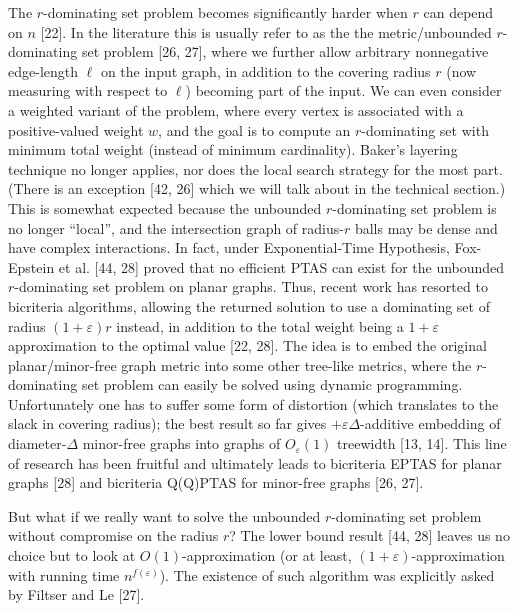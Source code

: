 The $r$-dominating set problem becomes significantly harder when $r$ can depend on $n$ [22]. In the literature this is usually refer to as the the metric/unbounded $r$-dominating set problem [26, 27], where we further allow arbitrary nonnegative edge-length $\ell$ on the input graph, in addition to the covering radius $r$ (now measuring with respect to $\ell$) becoming part of the input. We can even consider a weighted variant of the problem, where every vertex is associated with a positive-valued weight $w$, and the goal is to compute an $r$-dominating set with minimum total weight (instead of minimum cardinality). Baker’s layering technique no longer applies, nor does the local search strategy for the most part. (There is an exception [42, 26] which we will talk about in the technical section.) This is somewhat expected because the unbounded $r$-dominating set problem is no longer “local”, and the intersection graph of radius-$r$ balls may be dense and have complex interactions. In fact, under Exponential-Time Hypothesis, Fox-Epstein et al. [44, 28] proved that no efficient PTAS can exist for the unbounded $r$-dominating set problem on planar graphs. Thus, recent work has resorted to bicriteria algorithms, allowing the returned solution to use a dominating set of radius $(1+\varepsilon)r$ instead, in addition to the total weight being a $1+\varepsilon$ approximation to the optimal value [22, 28]. The idea is to embed the original planar/minor-free graph metric into some other tree-like metrics, where the $r$-dominating set problem can easily be solved using dynamic programming. Unfortunately one has to suffer some form of distortion (which translates to the slack in covering radius); the best result so far gives $+\varepsilon\Delta$-additive embedding of diameter-$\Delta$ minor-free graphs into graphs of $O_{\varepsilon}(1)$ treewidth [13, 14]. This line of research has been fruitful and ultimately leads to bicriteria EPTAS for planar graphs [28] and bicriteria Q(Q)PTAS for minor-free graphs [26, 27].
\par
\par
But what if we really want to solve the unbounded $r$-dominating set problem without compromise on the radius $r$? The lower bound result [44, 28] leaves us no choice but to look at $O(1)$-approximation (or at least, $(1+\varepsilon)$-approximation with running time $n^{f(\varepsilon)}$). The existence of such algorithm was explicitly asked by Filtser and Le [27].
\par
